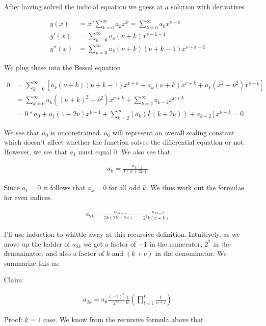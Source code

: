 \documentclass[12pt]{article}
\begin{document}
After having solved the indicial equation we guess at a solution with derivatives

\begin{align}
y(x) &= x^{\nu} \sum_{k=0}^{\infty} a_k x^k = \sum_{k=0}^{\infty} a_k x^{\nu+k}\\
y'(x) &= \sum_{k=0}^{\infty} a_k (\nu+k) x^{\nu+k-1}\\
y''(x) &= \sum_{k=0}^{\infty} a_k (\nu+k)(\nu+k-1) x^{\nu+k-2}
\end{align}

We plug these into the Bessel equation

\begin{align}
0 &= \sum_{k=0}^{\infty}\left[ a_k(\nu+k)(\nu+k-1) x^{\nu+k} + a_k(\nu+k)x^{\nu+k} + a_k(x^2-\nu^2)x^{\nu+k}\right]\\
&= \sum_{k=0}^{\infty} a_k ((\nu+k)^2 - \nu^2) x^{\nu+k} + \sum_{k=2}^{\infty} a_{k-2} x^{\nu+k}\\
&= 0*a_0 + a_1(1 + 2 \nu) x^{\nu+1} + \sum_{k=2}^{\infty}\left[a_k(k(k + 2 \nu)) + a_{k-2} \right] x^{\nu+k} = 0 
\end{align}

We see that $a_0$ is unconstrained. $a_0$ will represent an overall scaling constant which doesn't affect whether the function solves the differential equation or not. However, we see that $a_1$ must equal $0$. We also see that

\begin{align}
a_k = \frac{-a_{k-2}}{k(k+2\nu)}
\end{align}

Since $a_1 = 0$ it follows that $a_k = 0$ for all odd $k$. We thus work out the formulae for even indices.

\begin{align}
a_{2k} = \frac{-a_{2k-2}}{2k(2k+2\nu)} = \frac{-a_{2k-2}}{2^2k(\nu+k)}
\end{align}

I'll use induction to whittle away at this recursive definition. Intuitively, as we move up the ladder of $a_{2k}$ we get a factor of $-1$ in the numerator, $2^2$ in the denominator, and also a factor of $k$ and $(k+\nu)$ in the denominator. We summarize this as:

Claim:

\begin{align}
a_{2k} = a_0 \frac{(-1)^k}{2^{2k}}\frac{1}{k!} \left(\prod_{l=1}^k \frac{1}{\nu+l}\right)
\end{align}

Proof:
$k=1$ case. We know from the recursive formula above that
\end{document}

